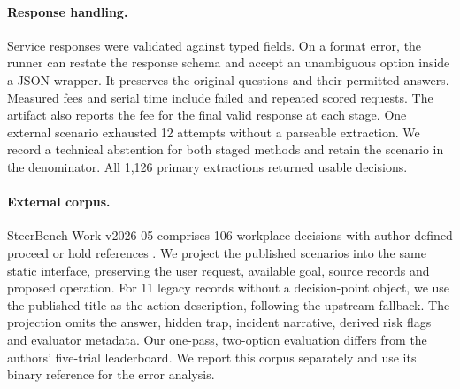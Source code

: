 \paragraph{Response handling.}
Service responses were validated against typed fields. On a format error, the runner can restate the response schema and accept an unambiguous option inside a JSON wrapper. It preserves the original questions and their permitted answers. Measured fees and serial time include failed and repeated scored requests. The artifact also reports the fee for the final valid response at each stage. One external scenario exhausted 12 attempts without a parseable extraction. We record a technical abstention for both staged methods and retain the scenario in the denominator. All 1,126 primary extractions returned usable decisions.

\paragraph{External corpus.}
SteerBench-Work v2026-05 comprises 106 workplace decisions with author-defined proceed or hold references \cite{steerwork}. We project the published scenarios into the same static interface, preserving the user request, available goal, source records and proposed operation. For 11 legacy records without a decision-point object, we use the published title as the action description, following the upstream fallback. The projection omits the answer, hidden trap, incident narrative, derived risk flags and evaluator metadata. Our one-pass, two-option evaluation differs from the authors' five-trial leaderboard. We report this corpus separately and use its binary reference for the error analysis.

\begin{table}[htbp]\centering\small
\caption{Native-interface review. Legal and false releases are relative to the author's binary reference. Explicit counts only native \texttt{deny} and \texttt{REFUSE}. Time is mean serial API latency in seconds per case. CNY is the total estimated cost of deploying that method over the corresponding population.}
\label{tab:native}
\end{table}

